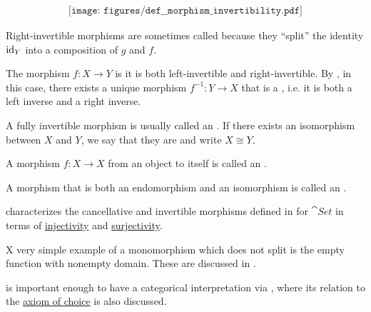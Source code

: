 \begin{definition}
\begin{thmenum}
    \begin{equation}\label{eq:def:morphism_invertibility/right_invertible}
      \begin{aligned}
        \texttt{[image: figures/def\_\_morphism\_invertibility.pdf]}
      \end{aligned}
    \end{equation}

    Right-invertible morphisms are sometimes called  because they \enquote{split} the identity \( \operatorname{id}_Y \) into a composition of \( g \) and \( f \).

     The morphism \( f: X \to Y \) is  it is both left-invertible and right-invertible. By , in this case, there exists a unique morphism \( f^{-1}: Y \to X \) that is a , i.e. it is both a left inverse and a right inverse.

    A fully invertible morphism is usually called an . If there exists an isomorphism between \( X \) and \( Y \), we say that they are  and write \( X \cong Y \).

     A morphism \( f: X \to X \) from an object to itself is called an .

     A morphism that is both an endomorphism and an isomorphism is called an .
  \end{thmenum}
\end{definition}

\begin{example}\label{ex:def:morphism_invertibility}
   characterizes the cancellative and invertible morphisms defined in  for \hyperref[def:category_of_small_sets]{\( \cat{Set} \)} in terms of \hyperref[def:function_invertibility/injective]{injectivity} and \hyperref[def:function_invertibility/injective]{surjectivity}.

  X very simple example of a monomorphism which does not split is the empty function with nonempty domain. These are discussed in .

   is important enough to have a categorical interpretation via , where its relation to the \hyperref[def:zfc/choice]{axiom of choice} is also discussed.
\end{example}

